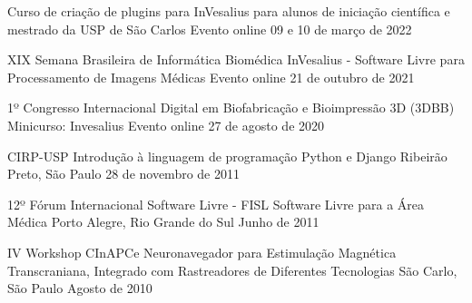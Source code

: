 \begin{cventries}

  \cventry
  {}
  {Curso de criação de plugins para InVesalius para alunos de iniciação científica e mestrado da USP de São Carlos}
  {Evento online}
  {09 e 10 de março de 2022}
  {}

  \cventry
  {XIX Semana Brasileira de Informática Biomédica}
  {InVesalius - Software Livre para Processamento de Imagens Médicas}
  {Evento online}
  {21 de outubro de 2021}
  {}

  \cventry
  {1º Congresso Internacional Digital em Biofabricação e Bioimpressão 3D (3DBB)}
  {Minicurso: Invesalius}
  {Evento online}
  {27 de agosto de 2020}
  {}

  \cventry
  {CIRP-USP}
  {Introdução à linguagem de programação Python e Django}
  {Ribeirão Preto, São Paulo}
  {28 de novembro de 2011}
  {}

  \cventry
  {12º Fórum Internacional Software Livre - FISL}
  {Software Livre para a Área Médica}
  {Porto Alegre, Rio Grande do Sul}
  {Junho de 2011}
  {}

  \cventry
  {IV Workshop CInAPCe}
  {Neuronavegador para Estimulação Magnética Transcraniana, Integrado com Rastreadores de Diferentes Tecnologias}
  {São Carlo, São Paulo}
  {Agosto de 2010}
  {}

\end{cventries}
